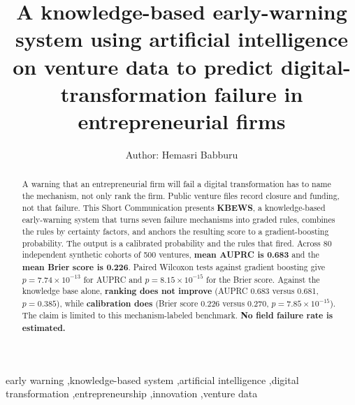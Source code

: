\documentclass[preprint,12pt]{elsarticle}
\begin{document}
\begin{frontmatter}

\title{A knowledge-based early-warning system using artificial intelligence on venture data to predict digital-transformation failure in entrepreneurial firms}

\author{Author: Hemasri Babburu}
\address{Doctor of Business Administration candidate. Affiliation and postal address to be inserted before submission.}

\begin{abstract}
A warning that an entrepreneurial firm will fail a digital transformation has to name the mechanism, not only rank the firm. Public venture files record closure and funding, not that failure. This Short Communication presents \textbf{KBEWS}, a knowledge-based early-warning system that turns seven failure mechanisms into graded rules, combines the rules by certainty factors, and anchors the resulting score to a gradient-boosting probability. The output is a calibrated probability and the rules that fired. Across 80 independent synthetic cohorts of 500 ventures, \textbf{mean AUPRC is 0.683} and the \textbf{mean Brier score is 0.226}. Paired Wilcoxon tests against gradient boosting give $p=7.74\times10^{-13}$ for AUPRC and $p=8.15\times10^{-15}$ for the Brier score. Against the knowledge base alone, \textbf{ranking does not improve} (AUPRC 0.683 versus 0.681, $p=0.385$), while \textbf{calibration does} (Brier score 0.226 versus 0.270, $p=7.85\times10^{-15}$). The claim is limited to this mechanism-labeled benchmark. \textbf{No field failure rate is estimated.}
\end{abstract}

\begin{keyword}
early warning \sep knowledge-based system \sep artificial intelligence \sep digital transformation \sep entrepreneurship \sep innovation \sep venture data
\end{keyword}

\end{frontmatter}
\end{document}
